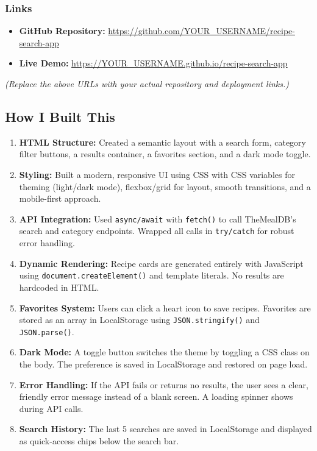 \documentclass[12pt]{article}
\begin{document}
\subsubsection*{Links}

\begin{itemize}[noitemsep]
    \item \textbf{GitHub Repository:} \url{https://github.com/YOUR_USERNAME/recipe-search-app}
    \item \textbf{Live Demo:} \url{https://YOUR_USERNAME.github.io/recipe-search-app}
\end{itemize}

\textit{(Replace the above URLs with your actual repository and deployment links.)}

\subsection*{How I Built This}

\begin{enumerate}
    \item \textbf{HTML Structure:} Created a semantic layout with a search form, category filter buttons, a results container, a favorites section, and a dark mode toggle.

    \item \textbf{Styling:} Built a modern, responsive UI using CSS with CSS variables for theming (light/dark mode), flexbox/grid for layout, smooth transitions, and a mobile-first approach.

    \item \textbf{API Integration:} Used \texttt{async/await} with \texttt{fetch()} to call TheMealDB's search and category endpoints. Wrapped all calls in \texttt{try/catch} for robust error handling.

    \item \textbf{Dynamic Rendering:} Recipe cards are generated entirely with JavaScript using \texttt{document.createElement()} and template literals. No results are hardcoded in HTML.

    \item \textbf{Favorites System:} Users can click a heart icon to save recipes. Favorites are stored as an array in LocalStorage using \texttt{JSON.stringify()} and \texttt{JSON.parse()}.

    \item \textbf{Dark Mode:} A toggle button switches the theme by toggling a CSS class on the body. The preference is saved in LocalStorage and restored on page load.

    \item \textbf{Error Handling:} If the API fails or returns no results, the user sees a clear, friendly error message instead of a blank screen. A loading spinner shows during API calls.

    \item \textbf{Search History:} The last 5 searches are saved in LocalStorage and displayed as quick-access chips below the search bar.
\end{enumerate}
\end{document}

